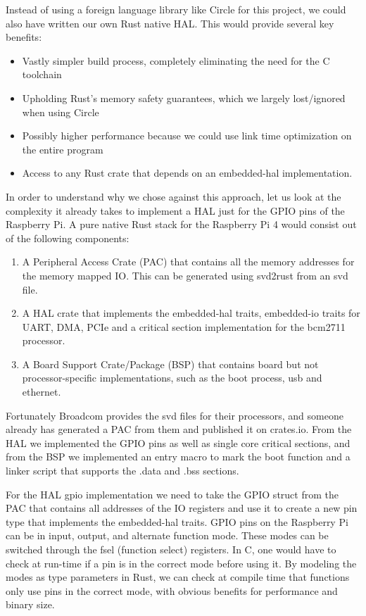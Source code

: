 Instead of using a foreign language library like Circle for this project, we could also have written our own Rust native HAL.
This would provide several key benefits:
\begin{itemize}
    \item Vastly simpler build process, completely eliminating the need for the C toolchain
    \item Upholding Rust's memory safety guarantees, which we largely lost/ignored when using Circle
    \item Possibly higher performance because we could use link time optimization on the entire program
    \item Access to any Rust crate that depends on an embedded-hal implementation.
\end{itemize}

In order to understand why we chose against this approach, let us look at the complexity it already takes to implement a HAL just for the GPIO pins of the Raspberry Pi.
A pure native Rust stack for the Raspberry Pi 4 would consist out of the following components:
\begin{enumerate}
    \item A Peripheral Access Crate (PAC) that contains all the memory addresses for the memory mapped IO. This can be generated using svd2rust from an svd file.
    \item A HAL crate that implements the embedded-hal traits, embedded-io traits for UART, DMA, PCIe and a critical section implementation for the bcm2711 processor.
    \item A Board Support Crate/Package (BSP) that contains board but not processor-specific implementations, such as the boot process, usb and ethernet.
\end{enumerate}

Fortunately Broadcom provides the svd files for their processors, and someone already has generated a PAC from them and published it on crates.io.
From the HAL we implemented the GPIO pins as well as single core critical sections, and from the BSP we implemented an entry macro to mark the boot function and a linker script that supports the .data and .bss sections.

For the HAL gpio implementation we need to take the GPIO struct from the PAC that contains all addresses of the IO registers and use it to create a new pin type that implements the embedded-hal traits.
GPIO pins on the Raspberry Pi can be in input, output, and alternate function mode. These modes can be switched through the fsel (function select) registers.
In C, one would have to check at run-time if a pin is in the correct mode before using it.
By modeling the modes as type parameters in Rust, we can check at compile time that functions only use pins in the correct mode, with obvious benefits for performance and binary size.

